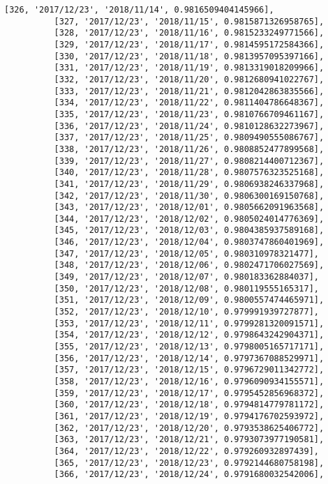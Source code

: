 \documentclass[11pt]{article}
\begin{document}
\begin{Verbatim}[commandchars=\\\{\}]
          [326, '2017/12/23', '2018/11/14', 0.9816509404145966],
          [327, '2017/12/23', '2018/11/15', 0.9815871326958765],
          [328, '2017/12/23', '2018/11/16', 0.9815233249771566],
          [329, '2017/12/23', '2018/11/17', 0.9814595172584366],
          [330, '2017/12/23', '2018/11/18', 0.9813957095397166],
          [331, '2017/12/23', '2018/11/19', 0.9813319018209966],
          [332, '2017/12/23', '2018/11/20', 0.9812680941022767],
          [333, '2017/12/23', '2018/11/21', 0.9812042863835566],
          [334, '2017/12/23', '2018/11/22', 0.9811404786648367],
          [335, '2017/12/23', '2018/11/23', 0.9810766709461167],
          [336, '2017/12/23', '2018/11/24', 0.9810128632273967],
          [337, '2017/12/23', '2018/11/25', 0.9809490555086767],
          [338, '2017/12/23', '2018/11/26', 0.9808852477899568],
          [339, '2017/12/23', '2018/11/27', 0.9808214400712367],
          [340, '2017/12/23', '2018/11/28', 0.9807576323525168],
          [341, '2017/12/23', '2018/11/29', 0.9806938246337968],
          [342, '2017/12/23', '2018/11/30', 0.9806300169150768],
          [343, '2017/12/23', '2018/12/01', 0.9805662091963568],
          [344, '2017/12/23', '2018/12/02', 0.9805024014776369],
          [345, '2017/12/23', '2018/12/03', 0.9804385937589168],
          [346, '2017/12/23', '2018/12/04', 0.9803747860401969],
          [347, '2017/12/23', '2018/12/05', 0.980310978321477],
          [348, '2017/12/23', '2018/12/06', 0.9802471706027569],
          [349, '2017/12/23', '2018/12/07', 0.980183362884037],
          [350, '2017/12/23', '2018/12/08', 0.980119555165317],
          [351, '2017/12/23', '2018/12/09', 0.9800557474465971],
          [352, '2017/12/23', '2018/12/10', 0.979991939727877],
          [353, '2017/12/23', '2018/12/11', 0.9799281320091571],
          [354, '2017/12/23', '2018/12/12', 0.9798643242904371],
          [355, '2017/12/23', '2018/12/13', 0.9798005165717171],
          [356, '2017/12/23', '2018/12/14', 0.9797367088529971],
          [357, '2017/12/23', '2018/12/15', 0.9796729011342772],
          [358, '2017/12/23', '2018/12/16', 0.9796090934155571],
          [359, '2017/12/23', '2018/12/17', 0.9795452856968372],
          [360, '2017/12/23', '2018/12/18', 0.9794814779781172],
          [361, '2017/12/23', '2018/12/19', 0.9794176702593972],
          [362, '2017/12/23', '2018/12/20', 0.9793538625406772],
          [363, '2017/12/23', '2018/12/21', 0.9793073977190581],
          [364, '2017/12/23', '2018/12/22', 0.979260932897439],
          [365, '2017/12/23', '2018/12/23', 0.9792144680758198],
          [366, '2017/12/23', '2018/12/24', 0.9791680032542006],

\end{Verbatim}
\end{document}

